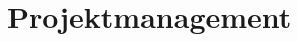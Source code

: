 \documentclass[main.tex]{subfiles} %
\begin{document}
\section{Projektmanagement}






\end{document}
